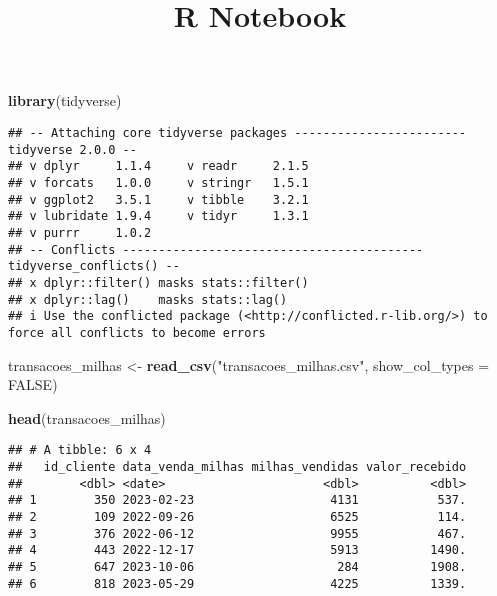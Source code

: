 \documentclass[
]{article}
\title{R Notebook}
\author{}
\date{\vspace{-2.5em}}
\newenvironment{Shaded}{\begin{snugshade}}{\end{snugshade}}
\newcommand{\AttributeTok}[1]{\textcolor[rgb]{0.13,0.29,0.53}{#1}}
\newcommand{\ConstantTok}[1]{\textcolor[rgb]{0.56,0.35,0.01}{#1}}
\newcommand{\FunctionTok}[1]{\textcolor[rgb]{0.13,0.29,0.53}{\textbf{#1}}}
\newcommand{\NormalTok}[1]{#1}
\newcommand{\OtherTok}[1]{\textcolor[rgb]{0.56,0.35,0.01}{#1}}
\newcommand{\StringTok}[1]{\textcolor[rgb]{0.31,0.60,0.02}{#1}}
\begin{document}
\maketitle

\begin{Shaded}
\begin{Highlighting}[]
\FunctionTok{library}\NormalTok{(tidyverse)}
\end{Highlighting}
\end{Shaded}

\begin{verbatim}
## -- Attaching core tidyverse packages ------------------------ tidyverse 2.0.0 --
## v dplyr     1.1.4     v readr     2.1.5
## v forcats   1.0.0     v stringr   1.5.1
## v ggplot2   3.5.1     v tibble    3.2.1
## v lubridate 1.9.4     v tidyr     1.3.1
## v purrr     1.0.2     
## -- Conflicts ------------------------------------------ tidyverse_conflicts() --
## x dplyr::filter() masks stats::filter()
## x dplyr::lag()    masks stats::lag()
## i Use the conflicted package (<http://conflicted.r-lib.org/>) to force all conflicts to become errors
\end{verbatim}

\begin{Shaded}
\begin{Highlighting}[]
\NormalTok{transacoes\_milhas }\OtherTok{\textless{}{-}} \FunctionTok{read\_csv}\NormalTok{(}\StringTok{"transacoes\_milhas.csv"}\NormalTok{, }\AttributeTok{show\_col\_types =} \ConstantTok{FALSE}\NormalTok{)}
\end{Highlighting}
\end{Shaded}

\begin{Shaded}
\begin{Highlighting}[]
\FunctionTok{head}\NormalTok{(transacoes\_milhas)}
\end{Highlighting}
\end{Shaded}

\begin{verbatim}
## # A tibble: 6 x 4
##   id_cliente data_venda_milhas milhas_vendidas valor_recebido
##        <dbl> <date>                      <dbl>          <dbl>
## 1        350 2023-02-23                   4131           537.
## 2        109 2022-09-26                   6525           114.
## 3        376 2022-06-12                   9955           467.
## 4        443 2022-12-17                   5913          1490.
## 5        647 2023-10-06                    284          1908.
## 6        818 2023-05-29                   4225          1339.
\end{verbatim}
\end{document}
